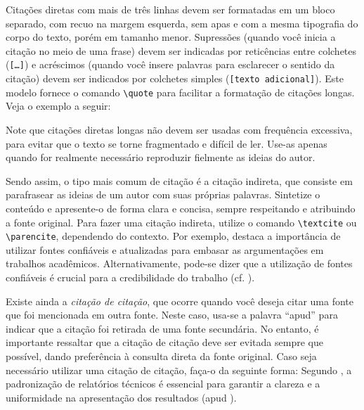 Citações diretas com mais de três linhas devem ser formatadas em um bloco separado, com recuo na
margem esquerda, sem apas e com a mesma tipografia do corpo do texto, porém em tamanho menor.
Supressões (quando você inicia a citação no meio de uma frase) devem ser indicadas por reticências entre colchetes
(\texttt{[\ldots]}) e acréscimos (quando você insere palavras para esclarecer o sentido da citação)
devem ser indicados por colchetes simples (\texttt{[texto adicional]}). Este modelo fornece o
comando \texttt{\textbackslash quote} para facilitar a formatação de citações longas. Veja o exemplo
a seguir:


Note que citações diretas longas não devem ser usadas com frequência excessiva, para evitar que o
texto se torne fragmentado e difícil de ler. Use-as apenas quando for realmente necessário
reproduzir fielmente as ideias do autor.

Sendo assim, o tipo mais comum de citação é a citação indireta,
que consiste em parafrasear as ideias de um autor com suas próprias palavras. Sintetize o conteúdo e
apresente-o de forma clara e concisa, sempre respeitando e atribuindo a fonte original.
Para fazer uma citação indireta, utilize o comando \texttt{\textbackslash textcite} ou
\texttt{\textbackslash parencite}, dependendo do contexto. Por exemplo, \textcite{silva2020} destaca a importância de
utilizar fontes confiáveis e atualizadas para embasar as argumentações em trabalhos acadêmicos.
Alternativamente, pode-se dizer que a utilização de fontes confiáveis é crucial para a credibilidade
do trabalho (cf. \parencite{silva2020}).

Existe ainda a \emph{citação de citação}, que ocorre quando você deseja citar uma fonte que foi
mencionada em outra fonte. Neste caso, usa-se a palavra ``apud'' para indicar que a citação foi
retirada de uma fonte secundária. No entanto, é importante ressaltar que a citação de citação deve
ser evitada sempre que possível, dando preferência à consulta direta da fonte original. Caso seja
necessário utilizar uma citação de citação, faça-o da seguinte forma: Segundo \textcite[p. 45]{oliveira2018}, a padronização de relatórios técnicos é essencial para garantir a clareza e a uniformidade na apresentação dos resultados (apud \textcite{fernandes2019}).